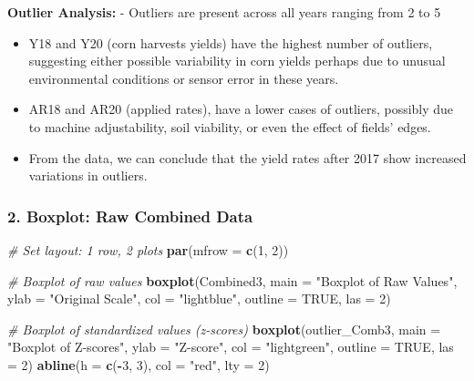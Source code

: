\documentclass[
]{article}
\newenvironment{Shaded}{\begin{snugshade}}{\end{snugshade}}
\newcommand{\AttributeTok}[1]{\textcolor[rgb]{0.13,0.29,0.53}{#1}}
\newcommand{\CommentTok}[1]{\textcolor[rgb]{0.56,0.35,0.01}{\textit{#1}}}
\newcommand{\ConstantTok}[1]{\textcolor[rgb]{0.56,0.35,0.01}{#1}}
\newcommand{\DecValTok}[1]{\textcolor[rgb]{0.00,0.00,0.81}{#1}}
\newcommand{\FunctionTok}[1]{\textcolor[rgb]{0.13,0.29,0.53}{\textbf{#1}}}
\newcommand{\NormalTok}[1]{#1}
\newcommand{\SpecialCharTok}[1]{\textcolor[rgb]{0.81,0.36,0.00}{\textbf{#1}}}
\newcommand{\StringTok}[1]{\textcolor[rgb]{0.31,0.60,0.02}{#1}}
\begin{document}
\textbf{Outlier Analysis:} - Outliers are present across all years
ranging from 2 to 5

\begin{itemize}
\item
  Y18 and Y20 (corn harvests yields) have the highest number of
  outliers, suggesting either possible variability in corn yields
  perhaps due to unusual environmental conditions or sensor error in
  these years.
\item
  AR18 and AR20 (applied rates), have a lower cases of outliers,
  possibly due to machine adjustability, soil viability, or even the
  effect of fields' edges.
\item
  From the data, we can conclude that the yield rates after 2017 show
  increased variations in outliers.
\end{itemize}

\subsubsection{2. Boxplot: Raw Combined
Data}\label{boxplot-raw-combined-data}

\begin{Shaded}
\begin{Highlighting}[]
\CommentTok{\# Set layout: 1 row, 2 plots}
\FunctionTok{par}\NormalTok{(}\AttributeTok{mfrow =} \FunctionTok{c}\NormalTok{(}\DecValTok{1}\NormalTok{, }\DecValTok{2}\NormalTok{))}

\CommentTok{\# Boxplot of raw values}
\FunctionTok{boxplot}\NormalTok{(Combined3,}
        \AttributeTok{main =} \StringTok{"Boxplot of Raw Values"}\NormalTok{,}
        \AttributeTok{ylab =} \StringTok{"Original Scale"}\NormalTok{,}
        \AttributeTok{col =} \StringTok{"lightblue"}\NormalTok{,}
        \AttributeTok{outline =} \ConstantTok{TRUE}\NormalTok{,}
        \AttributeTok{las =} \DecValTok{2}\NormalTok{)}

\CommentTok{\# Boxplot of standardized values (z{-}scores)}
\FunctionTok{boxplot}\NormalTok{(outlier\_Comb3,}
        \AttributeTok{main =} \StringTok{"Boxplot of Z{-}scores"}\NormalTok{,}
        \AttributeTok{ylab =} \StringTok{"Z{-}score"}\NormalTok{,}
        \AttributeTok{col =} \StringTok{"lightgreen"}\NormalTok{,}
        \AttributeTok{outline =} \ConstantTok{TRUE}\NormalTok{,}
        \AttributeTok{las =} \DecValTok{2}\NormalTok{)}
\FunctionTok{abline}\NormalTok{(}\AttributeTok{h =} \FunctionTok{c}\NormalTok{(}\SpecialCharTok{{-}}\DecValTok{3}\NormalTok{, }\DecValTok{3}\NormalTok{), }\AttributeTok{col =} \StringTok{"red"}\NormalTok{, }\AttributeTok{lty =} \DecValTok{2}\NormalTok{)}
\end{Highlighting}
\end{Shaded}
\end{document}
